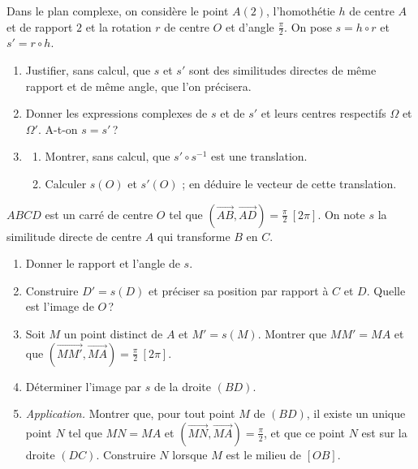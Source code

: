 \begin{exo}\label{exo:sim-composee}
      Dans le plan complexe, on considère le point $A(2)$, l'homothétie $h$ de centre $A$ et de rapport $2$
      et la rotation $r$ de centre $O$ et d'angle $\frac{\pi}{2}$. On pose $s = h \circ r$ et $s' = r \circ h$.
      \begin{enumerate}
            \item Justifier, sans calcul, que $s$ et $s'$ sont des similitudes directes de même rapport et de même angle, que l'on précisera.
            \item Donner les expressions complexes de $s$ et de $s'$ et leurs centres respectifs $\Omega$ et $\Omega'$. A-t-on $s = s'$\,?
            \item \begin{enumerate}
                        \item Montrer, sans calcul, que $s' \circ s^{-1}$ est une translation.
                        \item Calculer $s(O)$ et $s'(O)$ ; en déduire le vecteur de cette translation.
                  \end{enumerate}
      \end{enumerate}
\end{exo}
\begin{exo}\label{exo:sim-carre-construction}
      $ABCD$ est un carré de centre $O$ tel que $(\overrightarrow{AB},\overrightarrow{AD}) = \frac{\pi}{2}\ [2\pi]$.
      On note $s$ la similitude directe de centre $A$ qui transforme $B$ en $C$.
      \begin{enumerate}
            \item Donner le rapport et l'angle de $s$.
            \item Construire $D' = s(D)$ et préciser sa position par rapport à $C$ et $D$. Quelle est l'image de $O$\,?
            \item Soit $M$ un point distinct de $A$ et $M' = s(M)$. Montrer que $MM' = MA$ et que
                  $(\overrightarrow{MM'},\overrightarrow{MA}) = \frac{\pi}{2}\ [2\pi]$.
            \item Déterminer l'image par $s$ de la droite $(BD)$.
            \item \emph{Application.} Montrer que, pour tout point $M$ de $(BD)$, il existe un unique point $N$ tel que
                  $MN = MA$ et $(\overrightarrow{MN},\overrightarrow{MA}) = \frac{\pi}{2}$, et que ce point $N$ est sur la droite $(DC)$.
                  Construire $N$ lorsque $M$ est le milieu de $[OB]$.
      \end{enumerate}
\end{exo}
